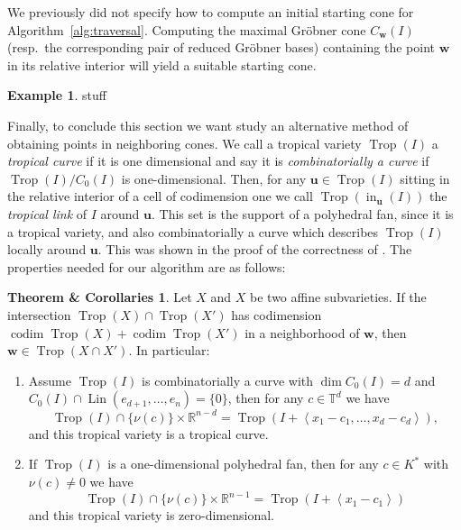 \documentclass[
  paper=a4,
  titlepage,
  bibliography=totoc,
  listof=totoc,
  pagesize=pdftex
]{scrartcl}
\numberwithin{figure}{section}
\numberwithin{equation}{section}
\numberwithin{table}{section}
\newcommand*\setR{\mathds{R}}
\newcommand*\setT{\mathds{T}}
\newcommand*\ideal[1]{\left\langle #1 \right\rangle}
\let\vec\mathbf
\DeclareMathOperator{\Trop}{Trop}
\DeclareMathOperator{\initial}{in}
\DeclareMathOperator{\Lin}{Lin}
\DeclareMathOperator{\codim}{codim}
\theoremstyle{definition}
\newtheorem{example}[definition]{Example}
\newtheorem{thmCorollary}[definition]{Theorem \& Corollaries}
\numberwithin{definition}{section}
\begin{document}
We previously did not specify how to compute an initial starting cone for
Algorithm~\ref{alg:traversal}. Computing the maximal Gröbner cone $C_{\vec w}(I)$ (resp.\
the corresponding pair of reduced Gröbner bases) containing the point $\vec w$ in its
relative interior will yield a suitable starting cone.

\begin{example}
  stuff
\end{example}

Finally, to conclude this section we want study an alternative method of obtaining points
in neighboring cones. We call a tropical variety $\Trop(I)$ a \emph{tropical curve} if it
is one dimensional and say it is \emph{combinatorially a curve} if $\Trop(I)/C_0(I)$ is
one-dimensional. Then, for any $\vec u \in \Trop(I)$ sitting in the relative interior of a
cell of codimension one we call $\Trop(\initial_{\vec u}(I))$ the \emph{tropical link} of
$I$ around $\vec u$. This set is the support of a polyhedral fan, since it is a tropical
variety, and also combinatorially a curve which describes $\Trop(I)$ locally around $\vec
u$. This was shown in the proof of the correctness of \cite[Algorithm~4.10]{compTropVar}.
The properties needed for our algorithm are as follows:

\begin{thmCorollary} \label{thmc:tropInt}
  Let $X$ and $X$ be two affine subvarieties. If the intersection $\Trop(X) \cap
  \Trop(X')$ has codimension $\codim\Trop(X) + \codim\Trop(X')$ in a neighborhood of $\vec
  w$, then $\vec w \in \Trop(X\cap X')$. In particular:
  \begin{enumerate}
    \item Assume $\Trop(I)$ is combinatorially a curve with $\dim C_0(I) = d$ and
      $C_0(I)\cap \Lin(e_{d+1}, \dots, e_n) = \{0\}$, then for any $c \in \setT^d$ we have
      \[
        \Trop(I) \cap \{\nu(c)\} \times \setR^{n-d} = \Trop(I + \ideal{x_1-c_1, \dots,
        x_d-c_d}),
      \]
      and this tropical variety is a tropical curve.
      \label{thmc:i}
    \item If $\Trop(I)$ is a one-dimensional polyhedral fan, then for any $c \in K^*$ with
      $\nu(c)\neq0$ we have
      \[
        \Trop(I) \cap \{\nu(c)\} \times \setR^{n-1} = \Trop(I + \ideal{x_1-c_1})
      \]
      and this tropical variety is zero-dimensional.
      \label{thmc:ii}
  \end{enumerate}
\end{thmCorollary}
\end{document}

